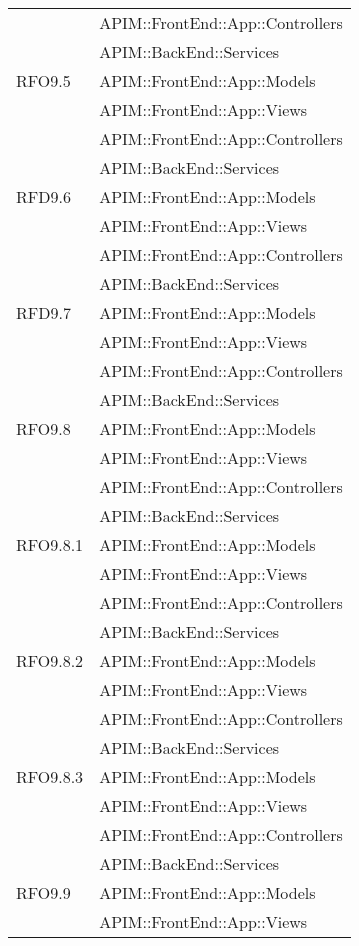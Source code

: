 \begin{longtable}{ p{4cm} | p{12cm} }
			& APIM::FrontEnd::App::Controllers \\
			& APIM::BackEnd::Services \\
			\hline		
			RFO9.5
			& APIM::FrontEnd::App::Models \\
			& APIM::FrontEnd::App::Views \\
			& APIM::FrontEnd::App::Controllers \\
			& APIM::BackEnd::Services \\
			\hline		
			RFD9.6
			& APIM::FrontEnd::App::Models \\
			& APIM::FrontEnd::App::Views \\
			& APIM::FrontEnd::App::Controllers \\
			& APIM::BackEnd::Services \\
			\hline		
			RFD9.7
			& APIM::FrontEnd::App::Models \\
			& APIM::FrontEnd::App::Views \\
			& APIM::FrontEnd::App::Controllers \\
			& APIM::BackEnd::Services \\
			\hline		
			RFO9.8
			& APIM::FrontEnd::App::Models \\
			& APIM::FrontEnd::App::Views \\
			& APIM::FrontEnd::App::Controllers \\
			& APIM::BackEnd::Services \\
			\hline		
			RFO9.8.1
			& APIM::FrontEnd::App::Models \\
			& APIM::FrontEnd::App::Views \\
			& APIM::FrontEnd::App::Controllers \\
			& APIM::BackEnd::Services \\
			\hline		
			RFO9.8.2
			& APIM::FrontEnd::App::Models \\
			& APIM::FrontEnd::App::Views \\
			& APIM::FrontEnd::App::Controllers \\
			& APIM::BackEnd::Services \\
			\hline		
			RFO9.8.3
			& APIM::FrontEnd::App::Models \\
			& APIM::FrontEnd::App::Views \\
			& APIM::FrontEnd::App::Controllers \\
			& APIM::BackEnd::Services \\
			\hline		
			RFO9.9
			& APIM::FrontEnd::App::Models \\
			& APIM::FrontEnd::App::Views \\

\end{longtable}
